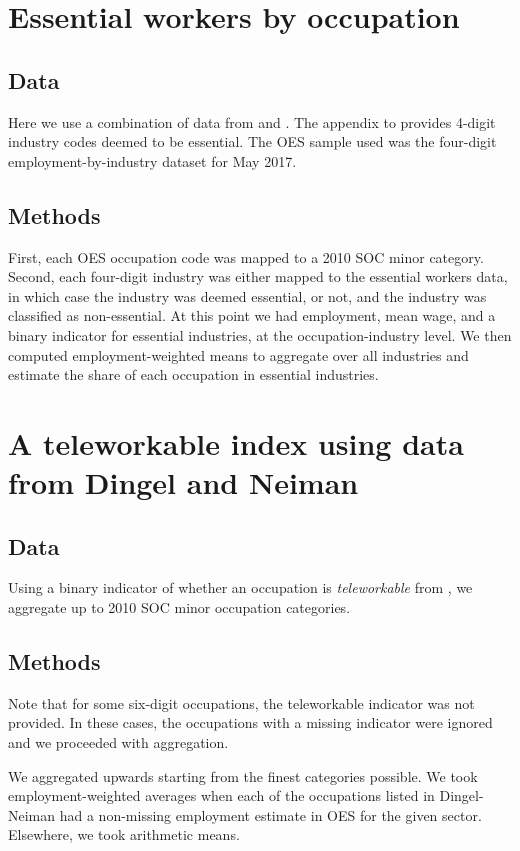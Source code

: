 \documentclass{article}
\begin{document}
\section{Essential workers by occupation}
\subsection{Data}
Here we use a combination of data from \cite{OES} and \cite{brookings}. The appendix to \cite{brookings} provides 4-digit industry codes deemed to be essential. The OES sample used was the four-digit employment-by-industry dataset for May 2017.

\subsection{Methods}
First, each OES occupation code was mapped to a 2010 SOC minor category. Second, each four-digit industry was either mapped to the essential workers data, in which case the industry was deemed essential, or not, and the industry was classified as non-essential.
At this point we had employment, mean wage, and a binary indicator for essential industries, at the occupation-industry level. We then computed employment-weighted means to aggregate over all industries and estimate the share of each occupation in essential industries.


\section{A teleworkable index using data from Dingel and Neiman}

\subsection{Data}
Using a binary indicator of whether an occupation is \emph{teleworkable} from \cite{DN}, we aggregate up to 2010 SOC minor occupation categories.

\subsection{Methods}
Note that for some six-digit occupations, the teleworkable indicator was not provided. In these cases, the occupations with a missing indicator were ignored and we proceeded with aggregation.

We aggregated upwards starting from the finest categories possible. We took employment-weighted averages when each of the occupations listed in Dingel-Neiman had a non-missing employment estimate in OES for the given sector. Elsewhere, we took arithmetic means. 
\end{document}
